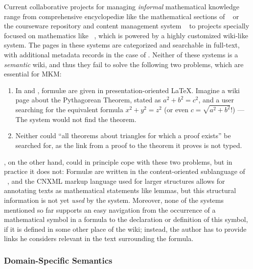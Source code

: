 \documentclass{llncs}
\begin{document}
Current collaborative projects for managing \emph{informal} mathematical knowledge range
from comprehensive encyclopediæ like the mathematical sections of
~\cite{wikipedia} or the courseware repository and content management
system ~\cite{CNX:whitepaper} to projects specially focused on
mathematics like ~\cite{krowne03:collaborative-math-libraries}, which
is powered by a highly customized wiki-like system.  The pages in these systems are
categorized and searchable in full-text, with additional metadata records in the case of
.  Neither of these systems is a \emph{semantic} wiki, and thus they
fail to solve the following two problems, which are essential for MKM:

\begin{enumerate}
\item\label{item:formula-search-usecase} In  and ,
  formulæ are given in presentation-oriented {\LaTeX}.  Imagine a wiki page about the
  Pythagorean Theorem, stated as $a^2 + b^2 = c^2$, and a user searching for the
  equivalent formula $x^2 + y^2 = z^2$ (or even $c=\sqrt{a^2+b^2}$!) --- The system would
  not find the theorem.
\item Neither could ``all theorems about triangles for which a
  proof exists'' be searched for, as the link from a proof to the theorem it proves is not
  typed.
\end{enumerate}

, on the other hand, could in principle cope with these two problems,
but in practice it does not: Formulæ are written in the content-oriented sublanguage of
{\mathml}~\cite{CarlisleEd:MathML07}, and the CNXML markup language used for larger
structures allows for annotating texts as mathematical statements like lemmas, but this
structural information is not yet \emph{used} by the system.  Moreover, none of the
systems mentioned so far supports an easy navigation from the occurrence of a mathematical
symbol in a formula to the declaration or definition of this symbol, if it is defined in
some other place of the wiki; instead, the author has to provide links he considers
relevant in the text surrounding the formula.

\subsubsection{Domain-Specific Semantics}
\label{sec:domain-semantics}
\end{document}
